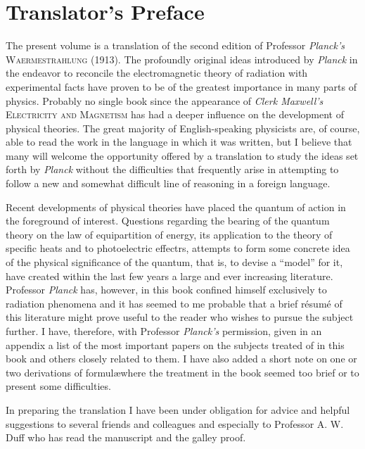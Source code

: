 \documentclass[12pt,oneside]{book}
\begin{document}

\chapter{Translator's Preface}
The present volume is a translation of the second edition of Professor \textit{Planck's} \textsc{Waermestrahlung} (1913). The profoundly original ideas introduced by \textit{Planck} in the endeavor to reconcile the electromagnetic theory of radiation with experimental facts have proven to be of the greatest importance in many parts of physics. Probably no single book since the appearance of \textit{Clerk Maxwell's} \textsc{Electricity and Magnetism} has had a deeper influence on the development of physical theories. The great majority of English-speaking physicists are, of course, able to read the work in the language in which it was written, but I believe that many will welcome the opportunity offered by a translation to study the ideas set forth by \textit{Planck} without the difficulties that frequently arise in attempting to follow a new and somewhat difficult line of reasoning in a foreign language. \par 

Recent developments of physical theories have placed the quantum of action in the foreground of interest. Questions regarding the bearing of the quantum theory on the law of equipartition of energy, its application to the theory of specific heats and to photoelectric effectrs, attempts to form some concrete idea of the physical significance of the quantum, that is, to devise a ``model'' for it, have created within the last few years a large and ever increasing literature. Professor \textit{Planck} has, however, in this book confined himself exclusively to radiation phenomena and it has seemed to me probable that a brief r\'esum\'e of this literature might prove useful to the reader who wishes to pursue the subject further. I have, therefore, with Professor \textit{Planck's} permission, given in an appendix a list of the most important papers on the subjects treated of in this book and others closely related to them. I have also added a short note on one or two derivations of formul\ae where the treatment in the book seemed too brief or to present some difficulties. \par 

In preparing the translation I have been under obligation for advice and helpful suggestions to several friends and colleagues and especially to Professor A. W. Duff who has read the manuscript and the galley proof. \par 
\end{document}
